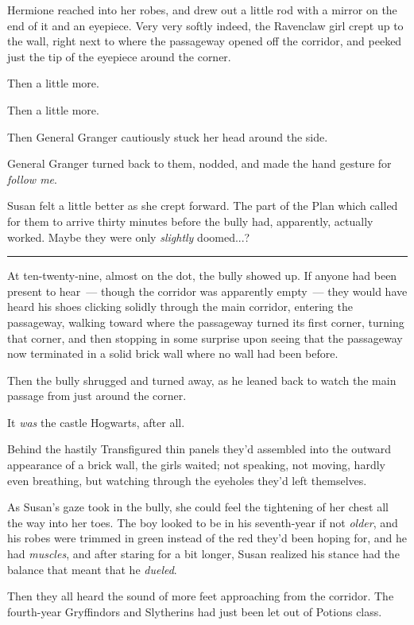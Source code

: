 Hermione reached into her robes, and drew out a little rod with a mirror on the end of it and an eyepiece. Very very softly indeed, the Ravenclaw girl crept up to the wall, right next to where the passageway opened off the corridor, and peeked just the tip of the eyepiece around the corner.

Then a little more.

Then a little more.

Then General Granger cautiously stuck her head around the side.

General Granger turned back to them, nodded, and made the hand gesture for \emph{follow me}.

Susan felt a little better as she crept forward. The part of the Plan which called for them to arrive thirty minutes before the bully had, apparently, actually worked. Maybe they were only \emph{slightly} doomed...?

\begin{center}\rule{3in}{0.4pt}\end{center}

At ten-twenty-nine, almost on the dot, the bully showed up. If anyone had been present to hear~--- though the corridor was apparently empty~--- they would have heard his shoes clicking solidly through the main corridor, entering the passageway, walking toward where the passageway turned its first corner, turning that corner, and then stopping in some surprise upon seeing that the passageway now terminated in a solid brick wall where no wall had been before.

Then the bully shrugged and turned away, as he leaned back to watch the main passage from just around the corner.

It \emph{was} the castle Hogwarts, after all.

Behind the hastily Transfigured thin panels they'd assembled into the outward appearance of a brick wall, the girls waited; not speaking, not moving, hardly even breathing, but watching through the eyeholes they'd left themselves.

As Susan's gaze took in the bully, she could feel the tightening of her chest all the way into her toes. The boy looked to be in his seventh-year if not \emph{older}, and his robes were trimmed in green instead of the red they'd been hoping for, and he had \emph{muscles}, and after staring for a bit longer, Susan realized his stance had the balance that meant that he \emph{dueled}.

Then they all heard the sound of more feet approaching from the corridor. The fourth-year Gryffindors and Slytherins had just been let out of Potions class.

